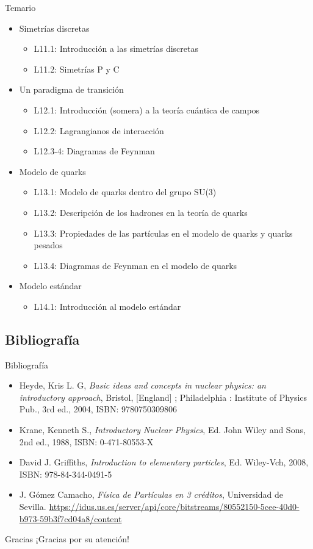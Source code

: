 \documentclass{beamer}
\begin{document}
\begin{frame}{Temario}
    \begin{itemize}
        \item Simetrías discretas
\begin{itemize}
        \item L11.1: Introducción a las simetrías discretas
        \item L11.2: Simetrías P y C
\end{itemize}        
        \item Un paradigma de transición
\begin{itemize}
        \item L12.1: Introducción (somera) a la teoría cuántica de campos
        \item L12.2: Lagrangianos de interacción
        \item L12.3-4: Diagramas de Feynman 
\end{itemize} 
        \item Modelo de quarks
\begin{itemize}
        \item L13.1: Modelo de quarks dentro del grupo SU(3)
        \item L13.2: Descripción de los hadrones en la teoría de quarks
        \item L13.3: Propiedades de las partículas en el modelo de quarks y quarks pesados
        \item L13.4: Diagramas de Feynman en el modelo de quarks
\end{itemize} 
        \item Modelo estándar
\begin{itemize}
        \item L14.1: Introducción al modelo estándar
\end{itemize}      
    \end{itemize}
\end{frame}
\subsection{Bibliografía}
\begin{frame}{Bibliografía}
    \begin{itemize}
        \item Heyde, Kris L. G, \textit{Basic ideas and concepts in nuclear physics: an introductory approach}, Bristol, [England] ; Philadelphia : Institute of Physics Pub., 3rd ed., 2004, ISBN: 9780750309806
        \item Krane, Kenneth S., \textit{Introductory Nuclear Physics}, Ed. John Wiley and Sons, 2nd
ed., 1988, ISBN: 0-471-80553-X
\item David J. Griffiths, \textit{Introduction to elementary particles}, Ed. Wiley-Vch, 2008, ISBN:
978-84-344-0491-5
\item J. Gómez Camacho, \textit{Física de Partículas en 3 créditos}, Universidad de Sevilla. \url{https://idus.us.es/server/api/core/bitstreams/80552150-5cee-40d0-b973-59b3f7cd04a8/content}
    \end{itemize}
\end{frame}

\begin{frame}{Gracias}
    \centering
    \Huge ¡Gracias por su atención!
\end{frame}
\end{document}
